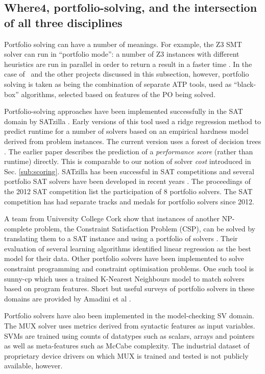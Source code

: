 \subsection{Where4, portfolio-solving, and the intersection of all three disciplines}
\label{sub:lrsvmmml}

Portfolio solving can have a number of meanings. For example, the Z3 SMT solver can run in ``portfolio mode'': a number of Z3 instances with different heuristics are run in parallel in order to return a result in a faster time \cite{WintersteigerHM09}. In the case of \where~and the other projects discussed in this subsection, however, portfolio solving is taken as being the combination of separate ATP tools, used as ``black-box'' algorithms, selected based on features of the PO being solved.

Portfolio-solving approaches have been implemented successfully in the SAT domain by SATzilla \cite{Satzilla}. Early versions of this tool used a ridge regression method to predict runtime for a number of solvers based on an empirical hardness model derived from problem instances. The current version \cite{SATzilla2012} uses a forest of decision trees . The earlier paper describes the prediction of a \textit{performance score} (rather than runtime) directly.  This is comparable to our notion of solver \textit{cost} introduced in Sec. \ref{sub:scoring}. SATzilla has been successful in SAT competitions and several portfolio SAT solvers have been developed in recent years \cite{SAT2012}.  The proceedings of the 2012 SAT competition 
list the participation of 8 portfolio solvers. The SAT competition has had separate tracks and medals for portfolio solvers since 2012.  

A team from University College Cork show that instances of another NP-complete problem, the Constraint Satisfaction Problem (CSP), can be solved by translating them to a SAT instance and using a portfolio of solvers \cite{Hurley2014}. Their evaluation of several learning algorithms identified linear regression as the best model for their data.
Other portfolio solvers have been implemented to solve constraint programming and constraint optimisation problems. 
One such tool is sunny-cp \cite{sunny-cp} which uses a trained K-Nearest Neighbours model to match solvers based on program features.
Short but useful surveys of portfolio solvers in these domains are provided by Amadini et al \cite{Amadini2013, Amadini2016}.   

Portfolio solvers have also been implemented in the model-checking SV domain. The MUX \cite{MUX} solver uses metrics derived from syntactic features as input variables. SVMs are trained using counts of datatypes such as scalars, arrays and pointers as well as meta-features such as McCabe complexity. The industrial dataset of proprietary device drivers on which MUX is trained and tested is not publicly available, however.   

